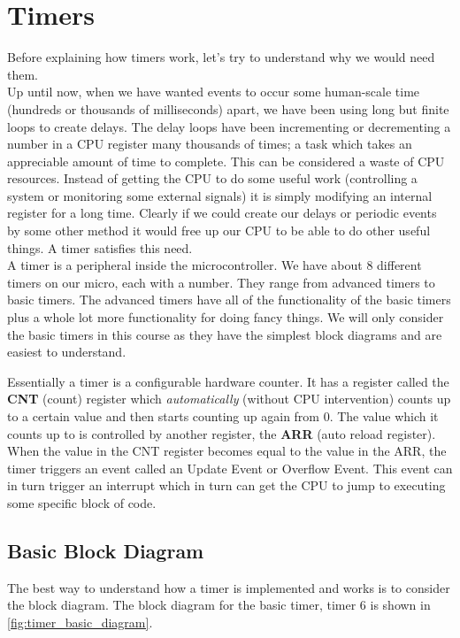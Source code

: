 \chapter{Timers}
Before explaining how timers work, let's try to understand why we would need them.\\

Up until now, when we have wanted events to occur some human-scale time (hundreds or thousands of milliseconds) apart, we have been using long but finite loops to create delays. 
The delay loops have been incrementing or decrementing a number in a CPU register many thousands of times; a task which takes an appreciable amount of time to complete. This can be considered a waste of CPU resources. Instead of getting the CPU to do some useful work (controlling a system or monitoring some external signals) it is simply modifying an internal register for a long time. 
Clearly if we could create our delays or periodic events by some other method it would free up our CPU to be able to do other useful things. 
A timer satisfies this need.\\


A timer is a peripheral inside the microcontroller. 
We have about 8 different timers on our micro, each with a number. 
They range from advanced timers to basic timers. 
The advanced timers have all of the functionality of the basic timers plus a whole lot more functionality for doing fancy things. 
We will only consider the basic timers in this course as they have the simplest block diagrams and are easiest to understand. 

Essentially a timer is a configurable hardware counter. It has a register called the \textbf{CNT} (count) register which \emph{automatically} (without CPU intervention) counts up to a certain value and then starts counting up again from 0. 
The value which it counts up to is controlled by another register, the \textbf{ARR} (auto reload register). 
When the value in the CNT register becomes equal to the value in the ARR, the timer triggers an event called an Update Event or Overflow Event.
This event can in turn trigger an interrupt which in turn can get the CPU to jump to executing some specific block of code. 

\section{Basic Block Diagram}
The best way to understand how a timer is implemented and works is to consider the block diagram. The block diagram for the basic timer, timer 6 is shown in \autoref{fig:timer_basic_diagram}.

